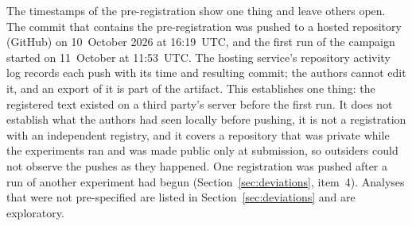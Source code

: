 \documentclass[review,12pt]{elsarticle}
\begin{document}
The timestamps of the pre-registration show one thing and leave others open. The commit that contains the
pre-registration was pushed to a hosted repository (GitHub) on 10~October 2026 at 16:19~UTC, and
the first run of the campaign started on 11~October at 11:53~UTC. The hosting service's
repository activity log records each push with its time and resulting commit; the authors
cannot edit it, and an export of it is part of the artifact. This establishes one thing: the registered text existed on a third
party's server before the first run. It does not establish what the authors had seen locally
before pushing, it is not a registration with an independent registry, and it covers a
repository that was private while the experiments ran and was made public only at submission, so outsiders could not observe the pushes as they happened. One
registration was pushed after a run of another experiment had begun
(Section~\ref{sec:deviations}, item~4). Analyses that were not pre-specified are listed in
Section~\ref{sec:deviations} and are exploratory.
\end{document}
